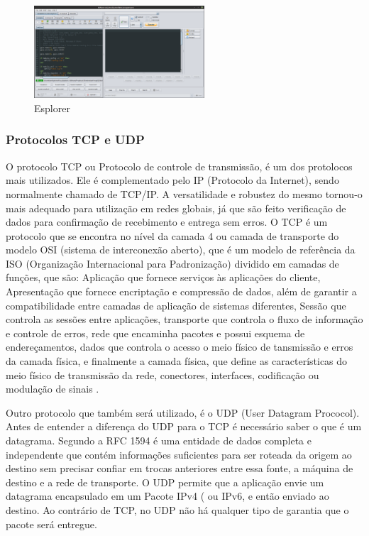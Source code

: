 \documentclass[journal]{IEEEtran}
\begin{document}
\begin{figure}[h]
\centering
\includegraphics[width=2.5in]{esplorer}
\caption{Esplorer \cite{ESPlorer}}
\label{esplorer}
\end{figure}

\subsubsection{Protocolos TCP e UDP}
O protocolo TCP ou Protocolo de controle de transmissão, é um dos protolocos mais utilizados. Ele é complementado pelo IP (Protocolo da Internet), sendo normalmente chamado de TCP/IP. A versatilidade e robustez do mesmo tornou-o mais adequado para utilização em redes globais, já que são feito verificação de dados para confirmação de recebimento e entrega sem erros. O TCP é um protocolo que se encontra no nível da camada 4 ou camada de transporte do modelo OSI (sistema de interconexão aberto), que é um modelo de referência da ISO (Organização Internacional para Padronização) dividido em camadas de funções, que são: Aplicação que fornece serviços às aplicações do cliente, Apresentação que fornece encriptação e compressão de dados, além de garantir a compatibilidade entre camadas de aplicação de sistemas diferentes, Sessão que controla as sessões entre aplicações, transporte que controla o fluxo de informação e controle de erros, rede que encaminha pacotes e possui esquema de endereçamentos, dados que controla o acesso o meio físico de tansmissão e erros da camada física, e finalmente a camada física, que define as características do meio físico de transmissão da rede, conectores, interfaces, codificação ou modulação de sinais \cite{pplwareosi}\cite{VintonTCP}.

Outro protocolo que também será utilizado, é o UDP (User Datagram Prococol). Antes de entender a diferença do UDP para o TCP é necessário saber o que é um datagrama. Segundo a RFC 1594 \cite{rfc1594} é uma entidade de dados completa e independente que contém informações suficientes para ser roteada da origem ao destino sem precisar confiar em trocas anteriores entre essa fonte, a máquina de destino e a rede de transporte. O UDP permite que a aplicação envie um datagrama encapsulado em um Pacote IPv4 ( ou IPv6, e então enviado ao destino. Ao contrário de TCP, no UDP não há qualquer tipo de garantia que o pacote será entregue.
\end{document}
